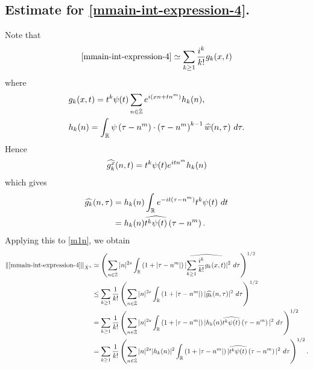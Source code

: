 \subsection{Estimate for
\texorpdfstring{\eqref{mmain-int-expression-4}}{Expression 4}.}
Note that
%
%
\begin{equation}
	\label{m1n}
	\begin{split}
		\eqref{mmain-int-expression-4} \simeq \sum_{k \ge 1}
		\frac{i^k}{k!}g_k(x,t)
	\end{split}
\end{equation}
%
%
where 
%
%
\begin{equation*}
	\begin{split}
		& g_k(x,t) = t^k \psi(t) \sum_{n \in \dot{\mathbb{Z}}} e^{i\left( xn + tn^m
		\right)} h_k(n),
		\\
		& h_k(n) = \int_{\mathbb{R}} \psi \left( \tau - n^m \right) \cdot \left(
		\tau - n^m \right)^{k -1} \widehat{w}(n, \tau) \ d \tau.
	\end{split}
\end{equation*}
%
%
Hence
%
%
\begin{equation*}
	\begin{split}
		\widehat{g_k^x}(n, t) = t^{k} \psi(t) e^{i t n^m} h_k(n)
	\end{split}
\end{equation*}
%
%
which gives
%
%
\begin{equation*}
	\begin{split}
		\widehat{g_k}(n, \tau)
		& = h_k(n) \int_{\mathbb{R}} e^{-it\left( \tau - n^m \right)}
		t^{k}\psi(t) \ dt
		\\
		& = h_k(n) \widehat{t^{k}\psi(t)} \left( \tau - n^m \right).
	\end{split}
\end{equation*}
%
%
Applying this to \eqref{m1n}, we obtain
%
%
\begin{equation}
	\label{m2n}
	\begin{split}
		\|\eqref{mmain-int-expression-4}\|_{\dot{X}^s} 
		& \simeq \left( \sum_{n \in \dot{\mathbb{Z}}} |n|^{2s} \int_{\mathbb{R}} \left( 1 + | \tau -
		n^m
		|
		\right) | \widehat{\sum_{k \ge 1} \frac{i^k}{k!}g_k(x,t)} |^2 \ d \tau
		\right)^{1/2}
		\\
		& \le \sum_{k \ge 1} \frac{1}{k!}\left( \sum_{n \in \dot{\mathbb{Z}}} |n|^{2s}
		\int_{\mathbb{R}} \left( 1 + | \tau - n^m | \right) | \widehat{g_k}(n, \tau) |^2 \
		d \tau \right)^{1/2}
		\\
		& = \sum_{k \ge 1} \frac{1}{k!} \left( \sum_{n \in \dot{\mathbb{Z}}} |n|^{2s}
		\int_{\mathbb{R}} \left( 1 + | \tau - n^m | \right) | h_k(n) \widehat{t^k
		\psi(t)} \left( \tau - n^m \right) |^2 \ d \tau \right)^{1/2}
		\\
		& = \sum_{k \ge 1} \frac{1}{k!} \left( \sum_{n \in \dot{\mathbb{Z}}} |n|^{2s} |
		h_k(n) |^2 \int_{\mathbb{R}} \left( 1 + | \tau - n^m | \right) | \widehat{t^k
		\psi(t)} \left( \tau - n^m \right) |^2 \ d \tau \right)^{1/2}.
	\end{split}
\end{equation}
